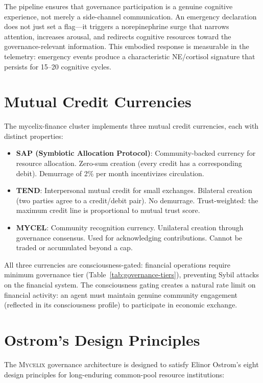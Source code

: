 \documentclass[12pt]{book}
\newcommand{\mycelix}{\textsc{Mycelix}}
\begin{document}
The pipeline ensures that governance participation is a genuine cognitive experience, not merely a side-channel communication. An emergency declaration does not just set a flag---it triggers a norepinephrine surge that narrows attention, increases arousal, and redirects cognitive resources toward the governance-relevant information. This embodied response is measurable in the telemetry: emergency events produce a characteristic NE/cortisol signature that persists for 15--20 cognitive cycles.

\section{Mutual Credit Currencies}

The mycelix-finance cluster implements three mutual credit currencies, each with distinct properties:

\begin{itemize}
  \item \textbf{SAP (Symbiotic Allocation Protocol)}: Community-backed currency for resource allocation. Zero-sum creation (every credit has a corresponding debit). Demurrage of 2\% per month incentivizes circulation.
  \item \textbf{TEND}: Interpersonal mutual credit for small exchanges. Bilateral creation (two parties agree to a credit/debit pair). No demurrage. Trust-weighted: the maximum credit line is proportional to mutual trust score.
  \item \textbf{MYCEL}: Community recognition currency. Unilateral creation through governance consensus. Used for acknowledging contributions. Cannot be traded or accumulated beyond a cap.
\end{itemize}

All three currencies are consciousness-gated: financial operations require minimum governance tier (Table~\ref{tab:governance-tiers}), preventing Sybil attacks on the financial system. The consciousness gating creates a natural rate limit on financial activity: an agent must maintain genuine community engagement (reflected in its consciousness profile) to participate in economic exchange.

\section{Ostrom's Design Principles}

The \mycelix{} governance architecture is designed to satisfy Elinor Ostrom's eight design principles for long-enduring common-pool resource institutions:
\end{document}
